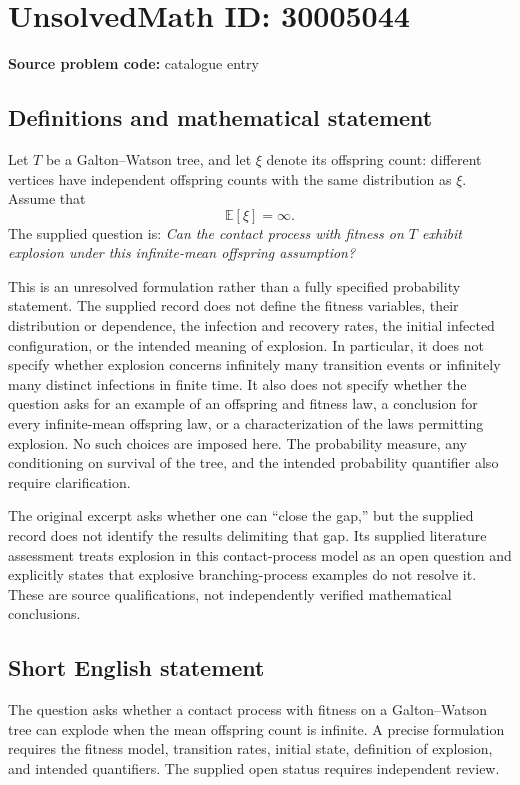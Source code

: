 \documentclass[11pt]{article}
\begin{document}
\section*{UnsolvedMath ID: 30005044}
\textbf{Source problem code:} catalogue entry
\subsection{Definitions and mathematical statement}
Let \(T\) be a Galton--Watson tree, and let \(\xi\) denote its offspring count: different vertices have independent offspring counts with the same distribution as \(\xi\). Assume that
\[
\mathbb E[\xi]=\infty.
\]
The supplied question is: \emph{Can the contact process with fitness on \(T\) exhibit explosion under this infinite-mean offspring assumption?}

This is an unresolved formulation rather than a fully specified probability statement. The supplied record does not define the fitness variables, their distribution or dependence, the infection and recovery rates, the initial infected configuration, or the intended meaning of explosion. In particular, it does not specify whether explosion concerns infinitely many transition events or infinitely many distinct infections in finite time. It also does not specify whether the question asks for an example of an offspring and fitness law, a conclusion for every infinite-mean offspring law, or a characterization of the laws permitting explosion. No such choices are imposed here. The probability measure, any conditioning on survival of the tree, and the intended probability quantifier also require clarification.

The original excerpt asks whether one can ``close the gap,'' but the supplied record does not identify the results delimiting that gap. Its supplied literature assessment treats explosion in this contact-process model as an open question and explicitly states that explosive branching-process examples do not resolve it. These are source qualifications, not independently verified mathematical conclusions.
\subsection{Short English statement}
The question asks whether a contact process with fitness on a Galton--Watson tree can explode when the mean offspring count is infinite. A precise formulation requires the fitness model, transition rates, initial state, definition of explosion, and intended quantifiers. The supplied open status requires independent review.
\end{document}
